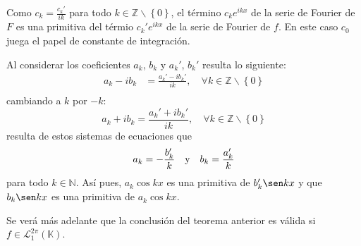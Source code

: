 \documentclass[12pt]{report}
\theoremstyle{largebreak}
\begin{document}
    \begin{obs}
        Como $c_k=\frac{c_k'}{ik}$ para todo $k\in\mathbb{Z}\backslash\left\{0 \right\}$, el término $c_ke^{ ikx}$ de la serie de Fourier de $F$ es una primitiva del térmio $c_k'e^{ ikx}$ de la serie de Fourier de $f$. En este caso $c_0$ juega el papel de constante de integración.
        
        Al considerar los coeficientes $a_k$, $b_k$ y $a_k'$, $b_k'$ resulta lo siguiente:
        \begin{equation*}
            \begin{split}
                a_k-ib_k&=\frac{a_k'-ib_k'}{ik},\quad\forall k\in\mathbb{Z}\backslash\left\{0 \right\} \\
            \end{split}
        \end{equation*}
        cambiando a $k$ por $-k$:
        \begin{equation*}
            a_k+ib_k=\frac{a_k'+ib_k'}{ik},\quad\forall k\in\mathbb{Z}\backslash\left\{0 \right\}
        \end{equation*}
        resulta de estos sistemas de ecuaciones que
        \begin{equation*}
            a_k=-\frac{b_k'}{k}\quad\textup{y}\quad b_k=\frac{a_k'}{k}
        \end{equation*}
        para todo $k\in\mathbb{N}$. Así pues, $a_k\cos kx$ es una primitiva de $b_k'\sen kx$ y que $b_k\sen kx$ es una primitiva de $a_k\cos kx$.
    \end{obs}

    Se verá más adelante que la conclusión del teorema anterior es válida si $f\in\mathcal{L}_1^{2\pi}(\mathbb{K})$.
\end{document}

